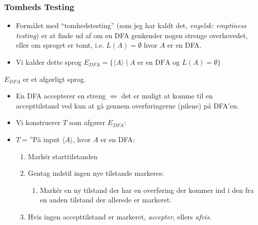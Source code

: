 \begin{frame}[allowframebreaks]
	\frametitle{Tomheds Testing}
	\begin{itemize}
		\item Formålet med ``tomhedstesting'' (som jeg har kaldt det, \textit{engelsk: emptiness testing}) er at finde ud af om en DFA genkender nogen strenge overhovedet, eller om sproget er tomt, i.e. $L(A) = \emptyset$ hvor $A$ er en DFA.
		\item Vi kalder dette sprog $E_{DFA} = \{\langle A \rangle \mid A \text{ er en DFA og }L(A) = \emptyset\}$
	\end{itemize}

	\begin{theorem}
		$E_{DFA}$ er et afgørligt sprog.
	\end{theorem}

	\begin{itemize}
		\item En DFA accepterer en streng $\iff$ det er muligt at komme til en accepttilstand ved kun at gå gennem overføringerne (pilene) på DFA'en.
		\item Vi konstruerer $T$ som afgører $E_{DFA}$:
		\item $T = $''På input \(\langle A \rangle\), hvor $A$ er en DFA:
		      \begin{enumerate}
			      \item Markér starttilstanden
			      \item Gentag indstil ingen nye tilstande markeres:
			            \begin{enumerate}
				            \item Markér en ny tilstand der har en overføring der kommer ind i den fra en anden tilstand der allerede er markeret.
			            \end{enumerate}
			      \item Hvis ingen accepttilstand er markeret, \textit{accepter}, ellers \textit{afvis}.
		      \end{enumerate}
	\end{itemize}
\end{frame}

